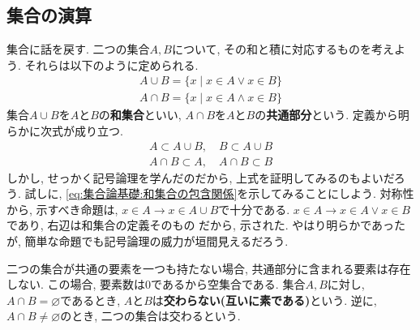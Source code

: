 \documentclass[a4j,dvipdfmx]{jsarticle}
\numberwithin{equation}{section}
\begin{document}
        \subsection{集合の演算}
            集合に話を戻す. 二つの集合$A,B$について, その和と積に対応するものを考えよう. それらは以下のように定められる.
            \begin{align}
                A\cup B = \{x\mid x\in A \lor x \in B\} \label{eq:集合論基礎:和集合の定義}\\
                A\cap B = \{x\mid x\in A \land x \in B\} \label{eq:集合論基礎:共通部分の定義}
            \end{align}
            集合$A\cup B$を$A$と$B$の\textbf{和集合}といい, $A\cap B$を$A$と$B$の\textbf{共通部分}という. 定義から明らかに次式が成り立つ.
            \begin{align}
                A\subset A \cup B,\quad B\subset A \cup B \label{eq:集合論基礎:和集合の包含関係}\\
                A \cap B \subset A,\quad A \cap B\subset B \label{eq:集合論基礎:共通部分の包含関係}
            \end{align}
            しかし, せっかく記号論理を学んだのだから, 上式を証明してみるのもよいだろう. 試しに, \eqref{eq:集合論基礎:和集合の包含関係}を示してみることにしよう.
            対称性から, 示すべき命題は, $x\in A \rightarrow x\in A \cup B$で十分である. $x \in A \rightarrow x \in A \lor x\in B$であり, 右辺は和集合の定義そのもの
            だから, 示された. やはり明らかであったが, 簡単な命題でも記号論理の威力が垣間見えるだろう.

            二つの集合が共通の要素を一つも持たない場合, 共通部分に含まれる要素は存在しない. この場合, 要素数は0であるから空集合である. 集合$A,B$に対し, $A\cap B =\varnothing$であるとき,
            $A$と$B$は\textbf{交わらない(互いに素である)}という. 逆に, $A\cap B\neq \varnothing$のとき, 二つの集合は交わるという.\\
\end{document}
